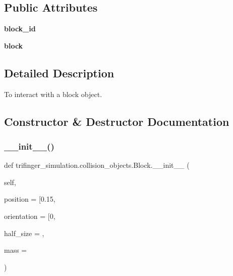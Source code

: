 \subsection*{Public Attributes}
\begin{DoxyCompactItemize}
\item 
\mbox{\label{classtrifinger__simulation_1_1collision__objects_1_1Block_aadfa2e441a4e6040e2329cc947098052}} 
{\bfseries block\+\_\+id}
\item 
\mbox{\label{classtrifinger__simulation_1_1collision__objects_1_1Block_a2c38cf1122541e586a939bb301f3d693}} 
{\bfseries block}
\end{DoxyCompactItemize}


\subsection{Detailed Description}
To interact with a block object. 

\subsection{Constructor \& Destructor Documentation}
\mbox{\label{classtrifinger__simulation_1_1collision__objects_1_1Block_a743f74849e2187fb1d6d40c30081666e}} 
\subsubsection{\texorpdfstring{\+\_\+\+\_\+init\+\_\+\+\_\+()}{\_\_init\_\_()}}
{\footnotesize\ttfamily def trifinger\+\_\+simulation.\+collision\+\_\+objects.\+Block.\+\_\+\+\_\+init\+\_\+\+\_\+ (\begin{DoxyParamCaption}\item[{}]{self,  }\item[{}]{position = {\ttfamily \mbox{[}0.15},  }\item[{}]{orientation = {\ttfamily \mbox{[}0},  }\item[{}]{half\+\_\+size = {},  }\item[{}]{mass = {} }\end{DoxyParamCaption})}



